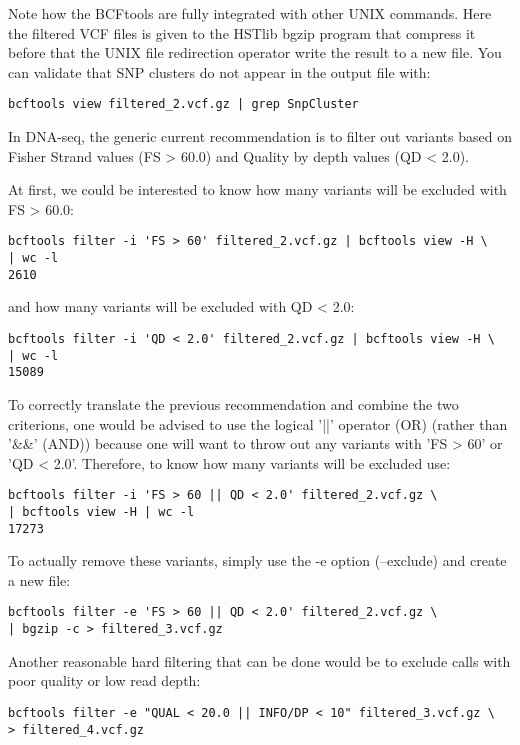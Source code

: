 Note how the BCFtools are fully integrated with other UNIX commands. Here the filtered VCF files is given to the HSTlib bgzip program that compress it before that the UNIX file redirection operator write the result to a new file. You can validate that SNP clusters do not appear in the output file with:


\begin{verbatim}
bcftools view filtered_2.vcf.gz | grep SnpCluster
\end{verbatim}

In DNA-seq, the generic current recommendation is to filter out variants based on Fisher Strand values (FS > 60.0) and Quality by depth values (QD < 2.0).

At first, we could be interested to know how many variants will be excluded with FS > 60.0:

\begin{verbatim}
bcftools filter -i 'FS > 60' filtered_2.vcf.gz | bcftools view -H \
| wc -l
2610
\end{verbatim}

and how many variants will be excluded with QD < 2.0:

\begin{verbatim}
bcftools filter -i 'QD < 2.0' filtered_2.vcf.gz | bcftools view -H \
| wc -l
15089
\end{verbatim}


To correctly translate the previous recommendation and combine the two criterions, one would be advised to use the logical '||' operator (OR) (rather than '\&\&' (AND)) because one will want to throw out any variants with 'FS > 60' or 'QD < 2.0'. Therefore, to know how many variants will be excluded use: 

\begin{verbatim}
bcftools filter -i 'FS > 60 || QD < 2.0' filtered_2.vcf.gz \
| bcftools view -H | wc -l
17273
\end{verbatim}

To actually remove these variants, simply use the -e option (--exclude) and create a new file:

\begin{verbatim}
bcftools filter -e 'FS > 60 || QD < 2.0' filtered_2.vcf.gz \
| bgzip -c > filtered_3.vcf.gz
\end{verbatim}

Another reasonable hard filtering that can be done would be to exclude calls with poor quality or low read depth:

\begin{verbatim}
bcftools filter -e "QUAL < 20.0 || INFO/DP < 10" filtered_3.vcf.gz \
> filtered_4.vcf.gz
\end{verbatim}

